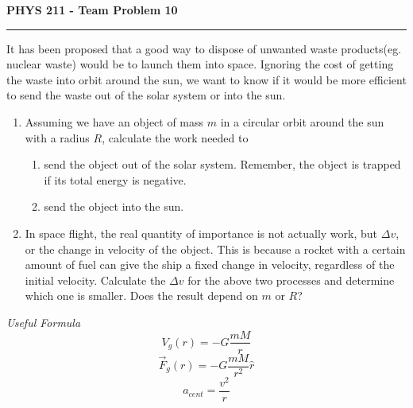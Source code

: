 \documentclass{article}
\begin{document}
\thispagestyle{empty}
\textbf{PHYS 211 - Team Problem 10}
\hrule
\vspace{.3in}
It has been proposed that a good way to dispose of unwanted waste products(eg. nuclear waste)
would be to launch them into space. Ignoring the cost of getting the waste into orbit around the
sun, we want to know if it would be more efficient to send the waste out of the solar system or into the sun.

\begin{enumerate}
  \item Assuming we have an object of mass $m$ in a circular orbit around the sun with a radius $R$, calculate the work needed to
    \begin{enumerate}
      \item send the object out of the solar system. Remember, the object is trapped if its total energy is negative.
      \item send the object into the sun.
    \end{enumerate}
  \item In space flight, the real quantity of importance is not actually work, but $\Delta v$, or the change in velocity of the object. This is because a rocket with a certain amount of fuel can give the ship a fixed change in velocity, regardless of the initial velocity. Calculate the $\Delta v$ for the above two processes and determine which one is smaller. Does the result depend on $m$ or $R$?
\end{enumerate}

\emph{Useful Formula}
\begin{equation*}
  V_g(r) = -G\frac{mM}{r}
\end{equation*}
\begin{equation*}
  \vec{F}_g(r) = -G\frac{mM}{r^2}\hat{r}
\end{equation*}
\begin{equation*}
  a_{cent} = \frac{v^2}{r}
\end{equation*}
\end{document}
